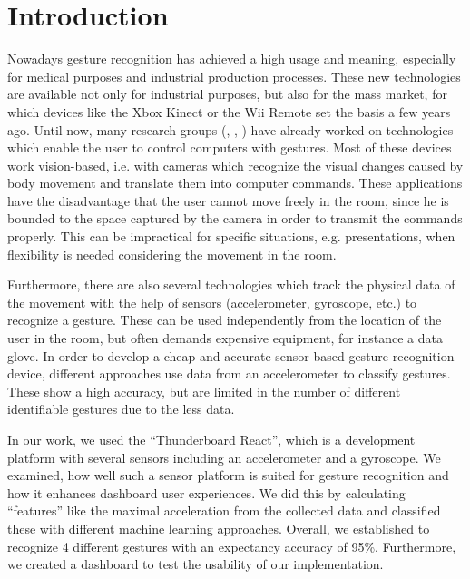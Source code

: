 
\chapter{Introduction}
\label{ch:Introduction}

Nowadays gesture recognition has achieved a high usage and meaning, especially for medical purposes and industrial production processes.
These new technologies are available not only for industrial purposes, but also for the mass market, for which devices like the Xbox Kinect or the Wii Remote set the basis a few years ago.
Until now, many research groups (\cite{vision1}, \cite{vision3}, \cite{vision2}) have already worked on technologies which enable the user to control computers with gestures.
Most of these devices work vision-based, i.e. with cameras which recognize the visual changes caused by body movement and translate them into computer commands.
These applications have the disadvantage that the user cannot move freely in the room, since he is bounded to the space captured by the camera in order to transmit the commands properly.
This can be impractical for specific situations, e.g. presentations, when flexibility is needed considering the movement in the room.

Furthermore, there are also several technologies which track the physical data of the movement with the help of sensors (accelerometer, gyroscope, etc.) to recognize a gesture.
These can be used independently from the location of the user in the room, but often demands expensive equipment, for instance a data glove.
In order to develop a cheap and accurate sensor based gesture recognition device, different approaches use data from an accelerometer to classify gestures.
These show a high accuracy, but are limited in the number of different identifiable gestures due to the less data.

In our work, we used the “Thunderboard React”, which is a development platform with several sensors including an accelerometer and a gyroscope.
We examined, how well such a sensor platform is suited for gesture recognition and how it enhances dashboard user experiences.
We did this by calculating “features” like the maximal acceleration from the collected data and classified these with different machine learning approaches.
Overall, we established to recognize 4 different gestures with an expectancy accuracy of 95\%.
Furthermore, we created a dashboard to test the usability of our implementation.
